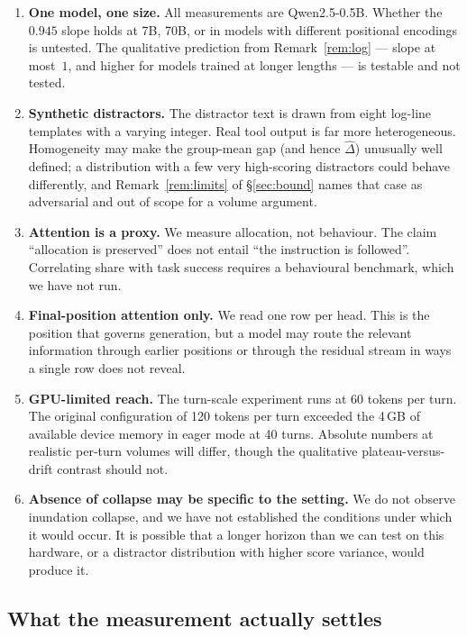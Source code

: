 \documentclass[11pt,a4paper]{article}
\theoremstyle{plain}
\theoremstyle{definition}
\theoremstyle{remark}
\begin{document}
\begin{enumerate}[label=(\alph*), leftmargin=*]
  \item \textbf{One model, one size.} All measurements are Qwen2.5-0.5B. Whether
        the $0.945$ slope holds at 7B, 70B, or in models with different
        positional encodings is untested. The qualitative prediction from
        Remark~\ref{rem:log} --- slope at most~$1$, and higher for models
        trained at longer lengths --- is testable and not tested.
  \item \textbf{Synthetic distractors.} The distractor text is drawn from eight
        log-line templates with a varying integer. Real tool output is far more
        heterogeneous. Homogeneity may make the group-mean gap
        (and hence $\hat{\Delta}$) unusually well defined; a distribution with
        a few very high-scoring distractors could behave differently, and
        Remark~\ref{rem:limits} of \S\ref{sec:bound} names that case as
        adversarial and out of scope for a volume argument.
  \item \textbf{Attention is a proxy.} We measure allocation, not behaviour. The
        claim ``allocation is preserved'' does not entail ``the instruction is
        followed''. Correlating share with task success requires a behavioural
        benchmark, which we have not run.
  \item \textbf{Final-position attention only.} We read one row per head. This
        is the position that governs generation, but a model may route the
        relevant information through earlier positions or through the residual
        stream in ways a single row does not reveal.
  \item \textbf{GPU-limited reach.} The turn-scale experiment runs at 60
        tokens per turn. The original configuration of 120 tokens per turn
        exceeded the 4\,GB of available device memory in eager mode at 40 turns.
        Absolute numbers at realistic per-turn volumes will differ, though the
        qualitative plateau-versus-drift contrast should not.
  \item \textbf{Absence of collapse may be specific to the setting.} We do not
        observe inundation collapse, and we have not established the conditions
        under which it would occur. It is possible that a longer horizon than we
        can test on this hardware, or a distractor distribution with higher score
        variance, would produce it.
\end{enumerate}

\subsection{What the measurement actually settles}
\end{document}
